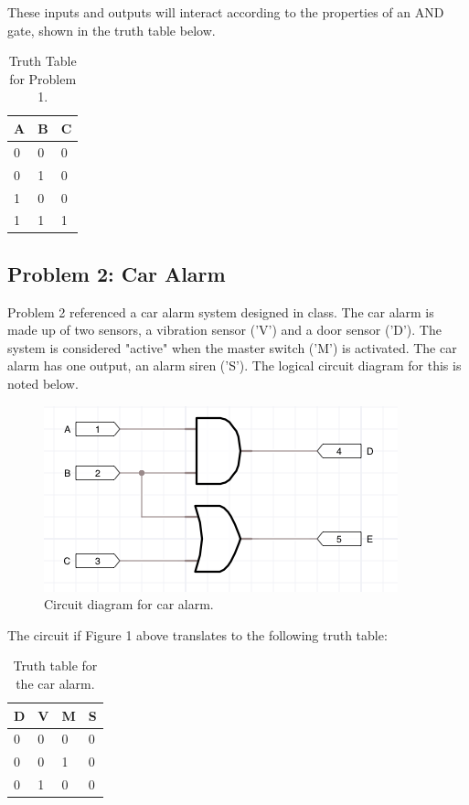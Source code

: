 \documentclass[11pt]{article}
\begin{document}
These inputs and outputs will interact according to the properties of an AND gate, shown in the truth table below.

\begin{table}[h]
\begin{center}
	\begin{tabular}{| l | l | l |}
		\hline
		A & B & C \\ \hline
		0 & 0 & 0 \\ \hline
		0 & 1 & 0 \\ \hline
		1 & 0 & 0 \\ \hline
		1 & 1 & 1 \\ \hline
	\end{tabular}
	\caption{\label{tab:table-name}Truth Table for Problem 1.}
\end{center}	
\end{table}



\subsection{Problem 2: Car Alarm}

Problem 2 referenced a car alarm system designed in class. The car alarm is made up of two sensors, a vibration sensor ('V') and a door sensor ('D'). The system is considered "active" when the master switch ('M') is activated. The car alarm has one output, an alarm siren ('S'). The logical circuit diagram for this is noted below.
\begin{figure}[h]
	\includegraphics[width=\textwidth]{report_images/img1}
	\caption{\label{fig:figure-name}Circuit diagram for car alarm.}
\end{figure}

The circuit if Figure 1 above translates to the following truth table:

\begin{table}[h]
\begin{center}
	\begin{tabular}{| l | l | l | l |}
	\hline
	D & V & M & S \\ \hline
	0 & 0 & 0 & 0 \\ \hline
	0 & 0 & 1 & 0 \\ \hline
	0 & 1 & 0 & 0 \\ \hline	
	\end{tabular}
	\caption{\label{tab:table-name}Truth table for the car alarm.}
\end{center}
\end{table}
\end{document}
